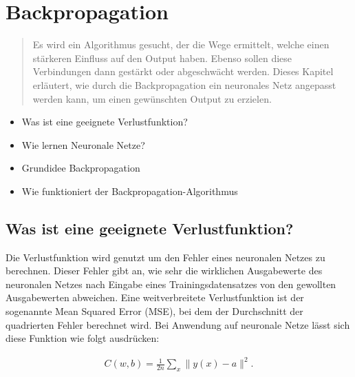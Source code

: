 \newpage
\thispagestyle{empty}
\section{Backpropagation}\label{sec:backpropagation}   

\vspace{1cm}
\begin{tcolorbox}[title={Inhalte der \textit{Backpropagation}}]
  \begin{quotation}\noindent
    Es wird ein Algorithmus gesucht, der die Wege ermittelt, welche einen stärkeren Einfluss auf den Output haben. Ebenso sollen diese Verbindungen dann gestärkt oder abgeschwächt werden.
    Dieses Kapitel erläutert, wie durch die Backpropagation ein neuronales Netz angepasst werden kann, um einen gewünschten Output zu erzielen. 
  \end{quotation}
  \begin{itemize}
    \item Was ist eine geeignete Verlustfunktion?
    \item Wie lernen Neuronale Netze?
    \item Grundidee Backpropagation
    \item Wie funktioniert der Backpropagation-Algorithmus
  \end{itemize}
\end{tcolorbox}

\subsection{Was ist eine geeignete Verlustfunktion?}\label{subsec:backpropagation:verlustfunktion}
Die Verlustfunktion wird genutzt um den Fehler eines neuronalen Netzes zu berechnen. Dieser Fehler gibt an, 
wie sehr die wirklichen Ausgabewerte des neuronalen Netzes nach Eingabe eines Trainingsdatensatzes von den gewollten Ausgabewerten abweichen. 
\bigbreak\noindent
Eine weitverbreitete Verlustfunktion ist der sogenannte Mean Squared Error (MSE), bei dem der Durchschnitt der quadrierten Fehler berechnet wird.
Bei Anwendung auf neuronale Netze lässt sich diese Funktion wie folgt ausdrücken:

\begin{eqnarray}  
  C(w,b) = \frac{1}{2n} \sum_x \| y(x) - a\|^2.
\end{eqnarray}


